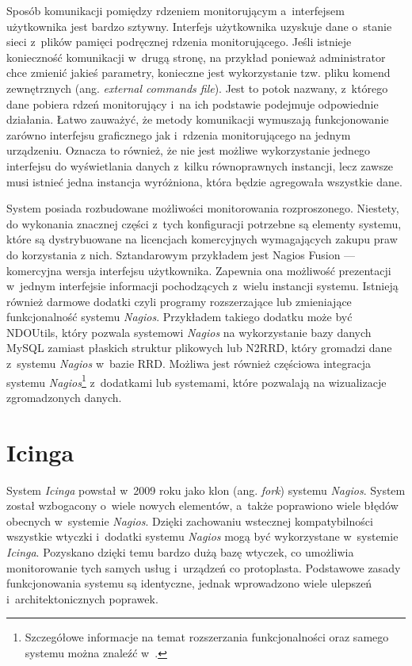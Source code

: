 Sposób komunikacji pomiędzy rdzeniem monitorującym a~interfejsem
użytkownika jest bardzo sztywny. Interfejs użytkownika uzyskuje dane
o~stanie sieci z~plików pamięci podręcznej rdzenia
monitorującego. Jeśli istnieje konieczność komunikacji w~drugą stronę,
na przykład ponieważ administrator chce zmienić jakieś parametry,
konieczne jest wykorzystanie tzw. pliku komend zewnętrznych (ang. {\em
  external commands file}). Jest to potok nazwany, z~którego dane
pobiera rdzeń monitorujący i~na ich podstawie podejmuje odpowiednie
działania. Łatwo zauważyć, że metody komunikacji wymuszają
funkcjonowanie zarówno interfejsu graficznego jak i~rdzenia
monitorującego na jednym urządzeniu. Oznacza to również, że nie jest
możliwe wykorzystanie jednego interfejsu do wyświetlania danych
z~kilku równoprawnych instancji, lecz zawsze musi istnieć jedna
instancja wyróżniona, która będzie agregowała wszystkie dane.

System posiada rozbudowane możliwości monitorowania
rozproszonego. Niestety, do wykonania znacznej części z~tych
konfiguracji potrzebne są elementy systemu, które są dystrybuowane na
licencjach komercyjnych wymagających zakupu praw do korzystania z
nich. Sztandarowym przykładem jest Nagios Fusion --- komercyjna
wersja interfejsu użytkownika. Zapewnia ona możliwość prezentacji
w~jednym interfejsie informacji pochodzących z~wielu instancji
systemu. Istnieją również darmowe dodatki czyli programy rozszerzające
lub zmieniające funkcjonalność systemu {\em Nagios}. Przykładem takiego
dodatku może być NDOUtils, który pozwala systemowi {\em Nagios} na
wykorzystanie bazy danych MySQL zamiast płaskich struktur plikowych
lub N2RRD, który gromadzi dane z~systemu {\em Nagios} w~bazie RRD. Możliwa
jest również częściowa integracja systemu {\em Nagios}\footnote{Szczegółowe
  informacje na temat rozszerzania funkcjonalności oraz samego systemu
  można znaleźć w~\cite{www:Nagios}.}  z~dodatkami lub systemami,
które pozwalają na wizualizacje zgromadzonych danych.

\section[Icinga][Icinga]{Icinga}
\label{subsec:Icinga}

System {\em Icinga} powstał w~2009 roku jako klon (ang. {\em fork}) systemu
{\em Nagios}. System został wzbogacony o~wiele nowych elementów, a~także
poprawiono wiele błędów obecnych w~systemie {\em Nagios}. Dzięki zachowaniu
wstecznej kompatybilności wszystkie wtyczki i~dodatki systemu {\em Nagios}
mogą być wykorzystane w~systemie {\em Icinga}. Pozyskano dzięki temu bardzo
dużą bazę wtyczek, co umożliwia monitorowanie tych samych usług
i~urządzeń co protoplasta. Podstawowe zasady funkcjonowania systemu są
identyczne, jednak wprowadzono wiele ulepszeń i~architektonicznych
poprawek.

